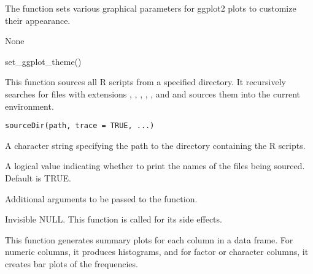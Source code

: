 \documentclass[a4paper]{book}
\begin{document}
%
\begin{Details}
The function sets various graphical parameters for ggplot2 plots to customize their appearance.
\end{Details}
%
\begin{Value}
None
\end{Value}
%
\begin{Examples}
\begin{ExampleCode}
set_ggplot_theme()

\end{ExampleCode}
\end{Examples}
%
\begin{Description}
This function sources all R scripts from a specified directory. It recursively searches for files
with extensions , , , , , and  and sources them into the current environment.
\end{Description}
%
\begin{Usage}
\begin{verbatim}
sourceDir(path, trace = TRUE, ...)
\end{verbatim}
\end{Usage}
%
\begin{Arguments}
\begin{ldescription}
\item[\code{path}] A character string specifying the path to the directory containing the R scripts.

\item[\code{trace}] A logical value indicating whether to print the names of the files being sourced. Default is TRUE.

\item[\code{...}] Additional arguments to be passed to the  function.
\end{ldescription}
\end{Arguments}
%
\begin{Value}
Invisible NULL. This function is called for its side effects.
\end{Value}
%
\begin{Description}
This function generates summary plots for each column in a data frame.
For numeric columns, it produces histograms, and for factor or character columns,
it creates bar plots of the frequencies.
\end{Description}
\end{document}
